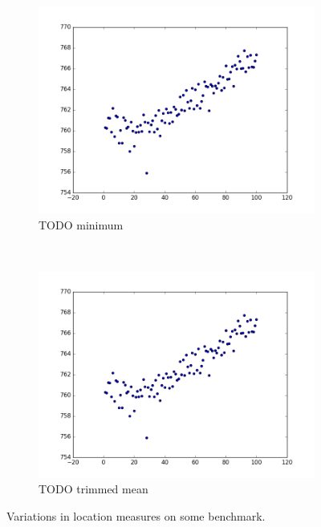 \documentclass[conference]{IEEEtran}
\begin{document}
\begin{figure}
\begin{subfigure}{0.22\textwidth}
    \centering
    \includegraphics[width=\textwidth]{experiments/images/mean_repeated_sqralloc}
    \caption{TODO minimum}
\end{subfigure}
~
\begin{subfigure}{0.22\textwidth}
    \centering
    \includegraphics[width=\textwidth]{experiments/images/mean_repeated_sqralloc}
    \caption{TODO trimmed mean}
\end{subfigure}

\caption{Variations in location measures on some benchmark.}
\label{fig:locationmeasures}
\end{figure}
\end{document}
